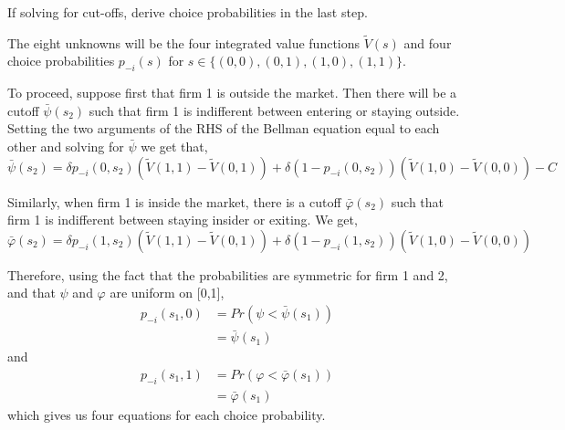 \documentclass{article}
\begin{document}
\begin{enumerate}
    If solving for cut-offs, derive choice probabilities in the last step.

\begin{answer}

The eight unknowns will be the four integrated value functions $\tilde{V}(s)$ and four choice probabilities $p_{-i}(s)$ for $s \in \{(0,0), (0,1), (1,0), (1,1)\}$.

To proceed, suppose first that firm 1 is outside the market. Then there will be a cutoff $\bar{\psi}(s_2)$ such that firm 1 is indifferent between entering or staying outside. Setting the two arguments of the RHS of the Bellman equation equal to each other and solving for $\bar{\psi}$ we get that,
\[
\bar{\psi}(s_2) = \delta p_{-i}(0,s_2)(\tilde{V}(1,1)-\tilde{V}(0,1)) +  \delta (1- p_{-i}(0,s_2))(\tilde{V}(1,0)-\tilde{V}(0,0)) - C
\]

Similarly, when firm 1 is inside the market, there is a cutoff $\bar{\varphi}(s_2)$ such that firm 1 is indifferent between staying insider or exiting. We get,
\[
\bar{\varphi}(s_2) = \delta p_{-i}(1,s_2)(\tilde{V}(1,1)-\tilde{V}(0,1)) + \delta (1-p_{-i}(1,s_2))(\tilde{V}(1,0)-\tilde{V}(0,0))
\] 

Therefore, using the fact that the  probabilities are symmetric for firm 1 and 2, and that $\psi$ and $\varphi$ are uniform on [0,1],
\begin{align*}
    p_{-i}(s_1,0) &= Pr(\psi < \bar{\psi}(s_1)) \\
    &= \bar{\psi}(s_1)
\end{align*}
and
\begin{align*}
    p_{-i}(s_1,1) &= Pr(\varphi < \bar{\varphi}(s_1)) \\
    &= \bar{\varphi}(s_1)
\end{align*}
which gives us four equations for each choice probability.


\end{answer}
\end{enumerate}
\end{document}
